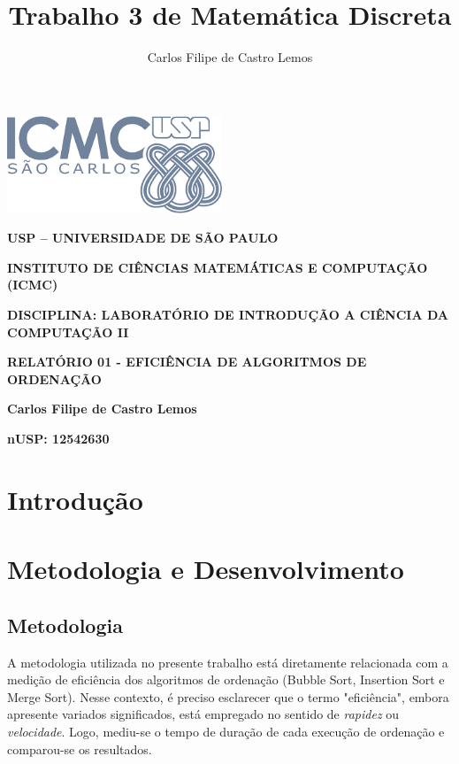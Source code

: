 \documentclass[a4paper, 12pt]{article}
\title{Trabalho 3 de Matemática Discreta}
\author{Carlos Filipe de Castro Lemos}
\begin{document}

\begin{center}
    \includegraphics[width=2.52778in,height=1.14532in]{logotipoICMC.png}

        \textbf{USP -- UNIVERSIDADE DE SÃO PAULO}

        \textbf{INSTITUTO DE CIÊNCIAS MATEMÁTICAS E COMPUTAÇÃO (ICMC)}

        \textbf{DISCIPLINA: LABORATÓRIO DE INTRODUÇÃO A CIÊNCIA DA COMPUTAÇÃO II}

    \vspace{0.9cm}

        \textbf{RELATÓRIO 01 - EFICIÊNCIA DE ALGORITMOS DE ORDENAÇÃO}

        \textbf{Carlos Filipe de Castro Lemos}

        \textbf{nUSP: 12542630}
    \end{center}


\section{Introdução}


\section{Metodologia e Desenvolvimento}


\subsection{Metodologia}
\tab A metodologia utilizada no presente trabalho está diretamente relacionada com a medição de eficiência dos algoritmos de ordenação (Bubble Sort, Insertion Sort e Merge Sort). Nesse contexto, é preciso esclarecer que o termo "eficiência", embora apresente variados significados, está empregado no sentido de \textit{rapidez} ou \textit{velocidade}. Logo, mediu-se o tempo de duração de cada execução de ordenação e comparou-se os resultados. 
\end{document}

